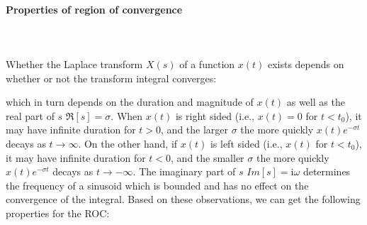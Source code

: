 	\paragraph{Properties of region of convergence}\mbox{}\\\\
	Whether the Laplace transform $X(s)$ of a function $x(t)$ exists depends on whether
	or not the transform integral converges:
	
	which in turn depends on the duration and magnitude of $x(t)$ as well as the real
	part of $s$ $\Re[s]=\sigma$. When $x(t)$ is right sided (i.e., $x(t)=0$ for $t<t_0$),
	it may have infinite duration for $t>0$, and the larger $\sigma$ the more quickly
	$x(t)e^{-\sigma t}$ decays as $t \rightarrow \infty$. On the other hand, if $x(t)$ 
	is left sided (i.e., $x(t)$ for $t<t_0$), it may have infinite duration for $t<0$,
	and the smaller $\sigma$ the more quickly $x(t)e^{-\sigma t}$ decays as $t \rightarrow
	-\infty$. The imaginary part of $s$ $Im[s]=\mathrm{i}\omega$ determines the frequency of a
	sinusoid which is bounded and has no effect on the convergence of the integral. 
	Based on these observations, we can get the following properties for the ROC:
	
